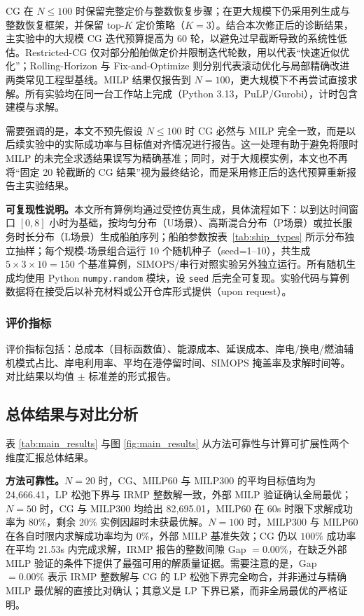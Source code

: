 \documentclass[UTF8, a4paper, 12pt]{ctexart}
\theoremstyle{plain}
\theoremstyle{definition}
\theoremstyle{remark}
\begin{document}
CG 在 $N\le 100$ 时保留完整定价与整数恢复步骤；在更大规模下仍采用列生成与整数恢复框架，并保留 top-$K$ 定价策略（$K=3$）。结合本次修正后的诊断结果，主实验中的大规模 CG 迭代预算提高为 60 轮，以避免过早截断导致的系统性低估。Restricted-CG 仅对部分船舶做定价并限制迭代轮数，用以代表“快速近似优化”；Rolling-Horizon 与 Fix-and-Optimize 则分别代表滚动优化与局部精确改进两类常见工程型基线。MILP 结果仅报告到 $N=100$，更大规模下不再尝试直接求解。所有实验均在同一台工作站上完成（Python 3.13，PuLP/Gurobi），计时包含建模与求解。

需要强调的是，本文不预先假设 $N\le 100$ 时 CG 必然与 MILP 完全一致，而是以后续实验中的实际成功率与目标值对齐情况进行报告。这一处理有助于避免将限时 MILP 的未完全求透结果误写为精确基准；同时，对于大规模实例，本文也不再将“固定 20 轮截断的 CG 结果”视为最终结论，而是采用修正后的迭代预算重新报告主实验结果。

\textbf{可复现性说明。}本文所有算例均通过受控仿真生成，具体流程如下：以到达时间窗口 $[0,8]$ 小时为基础，按均匀分布（U场景）、高斯混合分布（P场景）或拉长服务时长分布（L场景）生成船舶序列；船舶参数按表~\ref{tab:ship_types} 所示分布独立抽样；每个规模-场景组合运行 10 个随机种子（seed=1--10），共生成 $5 \times 3 \times 10 = 150$ 个基准算例，SIMOPS/串行对照实验另外独立运行。所有随机生成均使用 Python \texttt{numpy.random} 模块，设 \texttt{seed} 后完全可复现。实验代码与算例数据将在接受后以补充材料或公开仓库形式提供（upon request）。

\subsubsection{评价指标}
\label{sec:metrics}
评价指标包括：总成本（目标函数值）、能源成本、延误成本、岸电/换电/燃油辅机模式占比、岸电利用率、平均在港停留时间、SIMOPS 掩盖率及求解时间等。对比结果以均值 $\pm$ 标准差的形式报告。

\subsection{总体结果与对比分析}
\label{sec:overall_results}
表 \ref{tab:main_results} 与图 \ref{fig:main_results} 从方法可靠性与计算可扩展性两个维度汇报总体结果。

\textbf{方法可靠性。}$N=20$ 时，CG、MILP60 与 MILP300 的平均目标值均为 24{,}666.41，LP 松弛下界与 IRMP 整数解一致，外部 MILP 验证确认全局最优；$N=50$ 时，CG 与 MILP300 均给出 82{,}695.01，MILP60 在 60s 时限下求解成功率为 80\%，剩余 20\% 实例因超时未获最优解。$N=100$ 时，MILP300 与 MILP60 在各自时限内求解成功率均为 $0\%$，外部 MILP 基准失效；CG 仍以 $100\%$ 成功率在平均 21.53s 内完成求解，IRMP 报告的整数间隙 Gap $= 0.00\%$，在缺乏外部 MILP 验证的条件下提供了最强可用的解质量证据。需要注意的是，Gap $= 0.00\%$ 表示 IRMP 整数解与 CG 的 LP 松弛下界完全吻合，并非通过与精确 MILP 最优解的直接比对确认；其意义是 LP 下界已紧，而非全局最优的严格证明。
\end{document}
